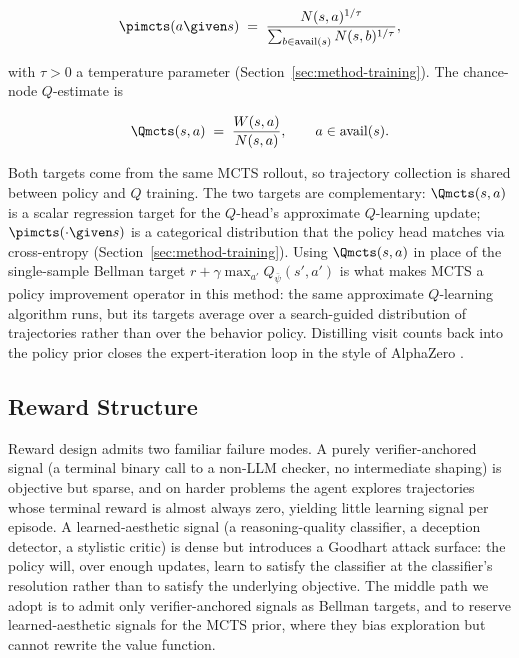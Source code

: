 \begin{equation}
\label{eq:pimcts}
\pimcts(a \given s)
\;=\;
\frac{N(s, a)^{1/\tau}}{\sum_{b \in \mathrm{avail}(s)} N(s, b)^{1/\tau}},
\end{equation}

with $\tau > 0$ a temperature parameter
(Section~\ref{sec:method-training}). The chance-node $Q$-estimate is

\begin{equation}
\label{eq:qmcts}
\Qmcts(s, a) \;=\; \frac{W(s, a)}{N(s, a)},
\qquad a \in \mathrm{avail}(s).
\end{equation}

Both targets come from the same MCTS rollout, so trajectory collection
is shared between policy and $Q$ training. The two targets are
complementary: $\Qmcts(s, a)$ is a scalar regression target for the
$Q$-head's approximate $Q$-learning update; $\pimcts(\cdot \given s)$
is a categorical distribution that the policy head matches via
cross-entropy (Section~\ref{sec:method-training}). Using
$\Qmcts(s, a)$ in place of the single-sample Bellman target
$r + \gamma \max_{a'} Q_{\bar\psi}(s', a')$ is what makes MCTS a policy
improvement operator in this method: the same approximate $Q$-learning
algorithm runs, but its targets average over a search-guided distribution
of trajectories rather than over the behavior policy. Distilling visit
counts back into the policy prior closes the expert-iteration loop in
the style of AlphaZero \citep{silver2017alphagozero, silver2018alphazero}.

\subsection{Reward Structure}
\label{sec:method-reward}

Reward design admits two familiar failure modes. A purely verifier-anchored
signal (a terminal binary call to a non-LLM checker, no intermediate
shaping) is objective but sparse, and on harder problems the agent
explores trajectories whose terminal reward is almost always zero,
yielding little learning signal per episode. A learned-aesthetic signal
(a reasoning-quality classifier, a deception detector, a stylistic
critic) is dense but introduces a Goodhart attack surface: the policy
will, over enough updates, learn to satisfy the classifier at the
classifier's resolution rather than to satisfy the underlying objective.
The middle path we adopt is to admit only verifier-anchored signals as
Bellman targets, and to reserve learned-aesthetic signals for the MCTS
prior, where they bias exploration but cannot rewrite the value
function.

